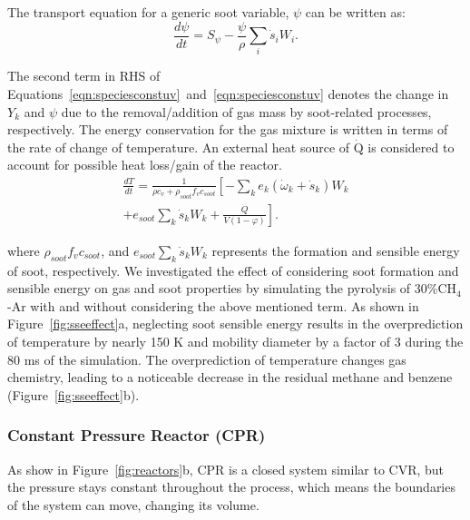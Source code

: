 The transport equation for a generic soot variable, $\psi$ can be written as:
\begin{equation}
	\frac{d \psi}{d t}= S_{\psi} - \frac{\psi}{\rho} \sum_i \dot{s}_i W_i
	\label{eqn:sootconstuv}.
\end{equation}

The second term in RHS of Equations~\eqref{eqn:speciesconstuv}~and~\eqref{eqn:speciesconstuv} denotes the change in $Y_k$ and $\psi$ due to the removal/addition of gas mass by soot-related processes, respectively. The energy conservation for the gas mixture is written in terms of the rate of change of temperature. An external heat source of $\mathrm{\dot{Q}}$ is considered to account for possible heat loss/gain of the reactor.
\begin{equation}
	\begin{split}
		\frac{d T}{d t}=
		\frac{1}{\rho c_v+\rho_{soot}f_v c_{soot}}
		\left[
			-\sum_k e_k
				\left(
					\dot{\omega}_k+\dot{s}_k
				\right) W_k
		\right. \\
		\left.
			+e_{soot}\sum_k \dot{s}_k W_k
			+\frac{\dot{Q}}{V(1-\varphi)}
		\right].
	\end{split}
	\label{eqn:energyconstuv}
\end{equation}

\noindent where $\rho_{soot}f_v c_{soot}$, and $e_{soot}\sum_k \dot{s}_k W_k$ represents the formation and sensible energy of soot, respectively. We investigated the effect of considering soot formation and sensible energy on gas and soot properties by simulating the pyrolysis of 30\%$\mathrm{CH_4}$-Ar with and without considering the above mentioned term. As shown in Figure~\ref{fig:sseeffect}a, neglecting soot sensible energy results in the overprediction of temperature by nearly 150 K and mobility diameter by a factor of 3 during the 80 ms of the simulation. The overprediction of temperature changes gas chemistry, leading to a noticeable decrease in the residual methane and benzene (Figure~\ref{fig:sseeffect}b).




\subsubsection{Constant Pressure Reactor (CPR)}

As show in Figure~\ref{fig:reactors}b, CPR is a closed system similar to CVR, but the pressure stays constant throughout the process, which means the boundaries of the system can move, changing its volume. %

